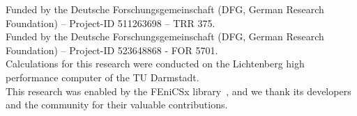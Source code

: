 \documentclass[pdflatex,sn-mathphys-num]{sn-jnl}%
\theoremstyle{thmstyleone}%
\theoremstyle{thmstyletwo}%
\theoremstyle{thmstylethree}%
\begin{document}











  Funded by the Deutsche Forschungsgemeinschaft (DFG, German Research Foundation) – Project-ID 511263698 – TRR 375.\\
  Funded by the Deutsche Forschungsgemeinschaft (DFG, German Research Foundation) – Project-ID 523648868 - FOR 5701.\\
  Calculations for this research were conducted on the Lichtenberg high performance computer of the TU Darmstadt. \\
This research was enabled by the FEniCSx library~\cite{fenicsx_documentation}, and we thank its developers and the community for their valuable contributions.\\
\end{document}
